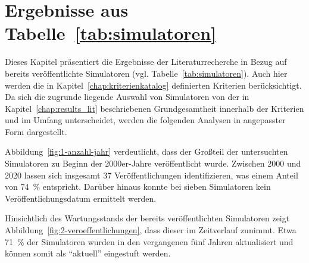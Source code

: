 \section{Ergebnisse aus Tabelle~\ref{tab:simulatoren}}

Dieses Kapitel präsentiert die Ergebnisse der Literaturrecherche in Bezug auf bereits veröffentlichte Simulatoren (vgl. Tabelle~\ref{tab:simulatoren}). Auch hier werden die in Kapitel~\ref{chap:kriterienkatalog} definierten Kriterien berücksichtigt. Da sich die zugrunde liegende Auswahl von Simulatoren von der in Kapitel~\ref{chap:results_lit} beschriebenen Grundgesamtheit innerhalb der Kriterien und im Umfang unterscheidet, werden die folgenden Analysen in angepasster Form dargestellt.

\vspace{1em}

Abbildung~\ref{fig:1-anzahl-jahr} verdeutlicht, dass der Großteil der untersuchten Simulatoren zu Beginn der 2000er-Jahre veröffentlicht wurde. Zwischen 2000 und 2020 lassen sich insgesamt 37 Veröffentlichungen identifizieren, was einem Anteil von 74~\% entspricht. Darüber hinaus konnte bei sieben Simulatoren kein Veröffentlichungsdatum ermittelt werden.

Hinsichtlich des Wartungsstands der bereits veröffentlichten Simulatoren zeigt Abbildung~\ref{fig:2-veroeffentlichungen}, dass dieser im Zeitverlauf zunimmt. Etwa 71~\% der Simulatoren wurden in den vergangenen fünf Jahren aktualisiert und können somit als \enquote{aktuell} eingestuft werden.

